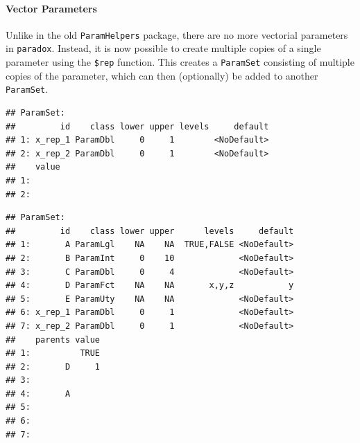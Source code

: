 \documentclass[]{article}
\newenvironment{Shaded}{\begin{snugshade}}{\end{snugshade}}
\newcommand{\DataTypeTok}[1]{\textcolor[rgb]{0.13,0.29,0.53}{#1}}
\newcommand{\DecValTok}[1]{\textcolor[rgb]{0.00,0.00,0.81}{#1}}
\newcommand{\KeywordTok}[1]{\textcolor[rgb]{0.13,0.29,0.53}{\textbf{#1}}}
\newcommand{\NormalTok}[1]{#1}
\newcommand{\OperatorTok}[1]{\textcolor[rgb]{0.81,0.36,0.00}{\textbf{#1}}}
\newcommand{\StringTok}[1]{\textcolor[rgb]{0.31,0.60,0.02}{#1}}
\let\oldparagraph\paragraph
\renewcommand{\paragraph}[1]{\oldparagraph{#1}\mbox{}}
\renewenvironment{Shaded} {\begin{snugshade}\small} {\end{snugshade}}
\begin{document}
\hypertarget{vector-parameters}{%
\paragraph{Vector Parameters}\label{vector-parameters}}

Unlike in the old \texttt{ParamHelpers} package, there are no more vectorial parameters in \texttt{paradox}.
Instead, it is now possible to create multiple copies of a single parameter using the \texttt{\$rep} function.
This creates a \texttt{ParamSet} consisting of multiple copies of the parameter, which can then (optionally) be added to another \texttt{ParamSet}.

\begin{Shaded}
\end{Shaded}

\begin{verbatim}
## ParamSet: 
##         id    class lower upper levels     default
## 1: x_rep_1 ParamDbl     0     1        <NoDefault>
## 2: x_rep_2 ParamDbl     0     1        <NoDefault>
##    value
## 1:      
## 2:
\end{verbatim}

\begin{Shaded}
\end{Shaded}

\begin{verbatim}
## ParamSet: 
##         id    class lower upper      levels     default
## 1:       A ParamLgl    NA    NA  TRUE,FALSE <NoDefault>
## 2:       B ParamInt     0    10             <NoDefault>
## 3:       C ParamDbl     0     4             <NoDefault>
## 4:       D ParamFct    NA    NA       x,y,z           y
## 5:       E ParamUty    NA    NA             <NoDefault>
## 6: x_rep_1 ParamDbl     0     1             <NoDefault>
## 7: x_rep_2 ParamDbl     0     1             <NoDefault>
##    parents value
## 1:          TRUE
## 2:       D     1
## 3:              
## 4:       A      
## 5:              
## 6:              
## 7:
\end{verbatim}
\end{document}
